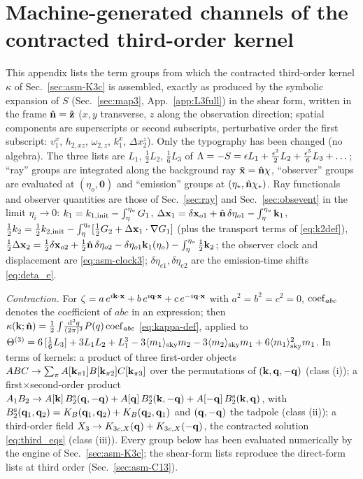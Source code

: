 \section{Machine-generated channels of the contracted third-order kernel}
\label{app:k3channels}
{\sloppy
This appendix lists the term groups from which the contracted third-order kernel $\kappa$ of Sec.~\ref{sec:asm-K3c} is assembled, exactly as
produced by the symbolic expansion of $S$ (Sec.~\ref{sec:map3}, App.~\ref{app:L3full}) in the shear form, written in the frame $\hat{\mathbf n}=\hat{\mathbf z}$
($x,y$ transverse, $z$ along the observation direction; spatial components are superscripts or second subscripts, perturbative order the
first subscript: $v^x_1$, $h_{2,xz}$, $\omega_{2,z}$, $k^x_1$, $\Delta x^z_2$).  Only the typography has been changed (no algebra).  The three
lists are $L_1$, $\tfrac12L_2$, $\tfrac16L_3$ of $\Lambda=-S=\epsilon L_1+\tfrac{\epsilon^2}2L_2+\tfrac{\epsilon^3}6L_3+\dots$; ``ray'' groups are integrated
along the background ray $\bar{\mathbf x}=\hat{\mathbf n}\chi$, ``observer'' groups are evaluated at $(\eta_o,\mathbf 0)$ and ``emission'' groups at $(\eta_*,\hat{\mathbf n}\chi_*)$.
Ray functionals and observer quantities are those of Sec.~\ref{sec:ray} and Sec.~\ref{sec:obsevent} in the limit $\eta_i\to0$:
$k_1=k_{1,\rm init}-\int_\eta^{\eta_o}G_1$, $\Delta\mathbf x_1=\delta\mathbf x_{o1}+\hat{\mathbf n}\,\delta\eta_{o1}-\int_\eta^{\eta_o}\mathbf k_1$,
$\tfrac12k_2=\tfrac12k_{2,\rm init}-\int_\eta^{\eta_o}[\tfrac12G_2+\Delta\mathbf x_1\cdot\nabla G_1]$ (plus the transport terms of \eqref{eq:k2def}),
$\tfrac12\Delta\mathbf x_2=\tfrac12\delta\mathbf x_{o2}+\tfrac12\hat{\mathbf n}\,\delta\eta_{o2}-\delta\eta_{o1}\mathbf k_1(\eta_o)-\int_\eta^{\eta_o}\tfrac12\mathbf k_2$; the observer clock and
displacement are \eqref{eq:asm-clock3}; $\delta\eta_{e1},\delta\eta_{e2}$ are the emission-time shifts \eqref{eq:deta_e}.

\emph{Contraction.}  For $\zeta=a\,e^{i\mathbf k\cdot\mathbf x}+b\,e^{i\mathbf q\cdot\mathbf x}+c\,e^{-i\mathbf q\cdot\mathbf x}$ with $a^2=b^2=c^2=0$, ${\rm coef}_{abc}$ denotes the
coefficient of $abc$ in an expression; then $\kappa(\mathbf k;\hat{\mathbf n})=\tfrac12\int\!\frac{\mathrm d^3q}{(2\pi)^3}P(q)\,{\rm coef}_{abc}$ \eqref{eq:kappa-def}, applied
to $\Theta^{(3)}=6\,[\tfrac16L_3]+3L_1L_2+L_1^3-3\langle m_1\rangle_{\rm sky}m_2-3\langle m_2\rangle_{\rm sky}m_1+6\langle m_1\rangle_{\rm sky}^2m_1$.  In terms of kernels: a product of three first-order
objects $ABC\to\sum_\pi A[\mathbf k_{\pi1}]B[\mathbf k_{\pi2}]C[\mathbf k_{\pi3}]$ over the permutations of $(\mathbf k,\mathbf q,-\mathbf q)$ (class (i));
a first$\times$second-order product $A_1B_2\to A[\mathbf k]\,B^{\rm s}_2(\mathbf q,-\mathbf q)+A[\mathbf q]\,B^{\rm s}_2(\mathbf k,-\mathbf q)+A[-\mathbf q]\,B^{\rm s}_2(\mathbf k,\mathbf q)$, with
$B^{\rm s}_2(\mathbf q_1,\mathbf q_2)=K_B(\mathbf q_1,\mathbf q_2)+K_B(\mathbf q_2,\mathbf q_1)$ and $(\mathbf q,-\mathbf q)$ the tadpole (class (ii)); a third-order field
$X_3\to K_{3c,X}(\mathbf q)+K_{3c,X}(-\mathbf q)$, the contracted solution \eqref{eq:third_eqs} (class (iii)).  Every group below has been evaluated
numerically by the engine of Sec.~\ref{sec:asm-K3c}; the shear-form lists reproduce the direct-form lists at third order (Sec.~\ref{sec:asm-C13}).\par}

